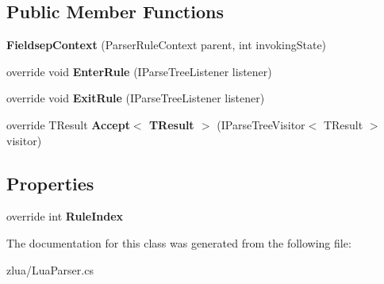 \subsection*{Public Member Functions}
\begin{DoxyCompactItemize}
\item 
\mbox{\label{classzlua_1_1_lua_parser_1_1_fieldsep_context_a4bce479ab9aa0661b63e47a29b949c62}} 
{\bfseries Fieldsep\+Context} (Parser\+Rule\+Context parent, int invoking\+State)
\item 
\mbox{\label{classzlua_1_1_lua_parser_1_1_fieldsep_context_ae5aa1cff79f8a3d90edd6d4214ae829c}} 
override void {\bfseries Enter\+Rule} (I\+Parse\+Tree\+Listener listener)
\item 
\mbox{\label{classzlua_1_1_lua_parser_1_1_fieldsep_context_a80a317c7aa832212d78d97444bb1c919}} 
override void {\bfseries Exit\+Rule} (I\+Parse\+Tree\+Listener listener)
\item 
\mbox{\label{classzlua_1_1_lua_parser_1_1_fieldsep_context_a6518594361fcbfcb276ff7164105634b}} 
override T\+Result {\bfseries Accept$<$ T\+Result $>$} (I\+Parse\+Tree\+Visitor$<$ T\+Result $>$ visitor)
\end{DoxyCompactItemize}
\subsection*{Properties}
\begin{DoxyCompactItemize}
\item 
\mbox{\label{classzlua_1_1_lua_parser_1_1_fieldsep_context_a2590c6671398bf7c0e0fd0e16c4c5b40}} 
override int {\bfseries Rule\+Index}
\end{DoxyCompactItemize}


The documentation for this class was generated from the following file\+:\begin{DoxyCompactItemize}
\item 
zlua/Lua\+Parser.\+cs\end{DoxyCompactItemize}
